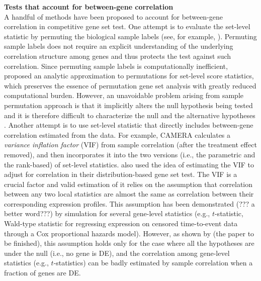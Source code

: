\documentclass[useAMS,usenatbib, galley]{biom}
\begin{document}
	\textbf{Tests that account for between-gene correlation}\\
	A handful of methods have been proposed to account for between-gene correlation in competitive gene set test. One attempt is to evaluate the set-level statistic by permuting the biological sample labels (see, for example, \cite{subramanian2005gene, efron2007testing}). Permuting sample labels does not require an explicit understanding of the underlying correlation structure among genes and thus protects the test against such correlation. Since permuting sample labels is computationally inefficient, \cite{zhou2013empirical} proposed an analytic approximation to permutations for set-level score statistics, which preserves the essence of permutation gene set analysis with greatly reduced computational burden. However, an unavoidable problem arising from sample permutation approach is that it implicitly alters the null hypothesis being tested and it is therefore difficult to characterize the null and the alternative hypotheses \citep{goeman2007analyzing, khatri2012ten, wu2012camera}. Another attempt is to use set-level statistic that directly includes between-gene correlation estimated from the data. For example, CAMERA \citep{wu2012camera} calculates a \textit{variance inflation factor} (VIF) from sample correlation (after the treatment effect removed), and then incorporates it into the two versions (i.e., the parametric and the rank-based) of set-level statistics. \cite{yaari2013quantitative} also used the idea of estimating the VIF to adjust for correlation in their distribution-based gene set test. The VIF is a crucial factor and valid estimation of it relies on the assumption that correlation between any two local statistics are almost the same as correlation between their corresponding expression profiles. This assumption has been demonstrated (??? a better word???) by simulation \citep{barry2008statistical} for several gene-level statistics (e.g., $t$-statistic, Wald-type statistic for regressing expression on censored time-to-event data through a Cox proportional hazards model). However, as shown by (the paper to be finished), this assumption holds only for the case where all the hypotheses are under the null (i.e., no gene is DE), and the correlation among gene-level statistics (e.g., $t$-statistics) can be badly estimated by sample correlation when a fraction of genes are DE. 
	
\end{document}
